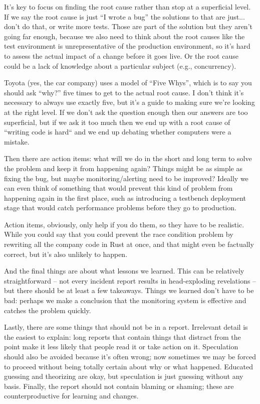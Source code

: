\documentclass[a4paper]{report}
\begin{document}
It's key to focus on finding the root cause rather than stop at a superficial level. If we say the root cause is just ``I wrote a bug'' the solutions to that are just... don't do that, or write more tests. Those are part of the solution but they aren't going far enough, because we also need to think about the root causes like the test environment is unrepresentative of the production environment, so it's hard to assess the actual impact of a change before it goes live. Or the root cause could be a lack of knowledge about a particular subject (e.g., concurrency). 

Toyota (yes, the car company) uses a model of ``Five Whys'', which is to say you should ask ``why?'' five times to get to the actual root cause. I don't think it's necessary to always use exactly five, but it's a guide to making sure we're looking at the right level. If we don't ask the question enough then our answers are too superficial, but if we ask it too much then we end up with a root cause of ``writing code is hard`` and we end up debating whether computers were a mistake.

Then there are action items: what will we do in the short and long term to solve the problem and keep it from happening again? Things might be as simple as fixing the bug, but maybe monitoring/alerting need to be improved? Ideally we can even think of something that would prevent this kind of problem from happening again in the first place, such as introducing a testbench deployment stage that would catch performance problems before they go to production. 

Action items, obviously, only help if you do them, so they have to be realistic. While you could say that you could prevent the race condition problem by rewriting all the company code in Rust at once, and that might even be factually correct, but it's also unlikely to happen.

And the final things are about what lessons we learned. This can be relatively straightforward -- not every incident report results in head-exploding revelations -- but there should be at least a few takeaways. Things we learned don't have to be bad: perhaps we make a conclusion that the monitoring system is effective and catches the problem quickly. 

Lastly, there are some things that should not be in a report. Irrelevant detail is the easiest to explain: long reports that contain things that distract from the point make it less likely that people read it or take action on it. Speculation should also be avoided because it's often wrong; now sometimes we may be forced to proceed without being totally certain about why or what happened. Educated guessing and theorizing are okay, but speculation is just guessing without any basis. Finally, the report should not contain blaming or shaming; these are counterproductive for learning and changes. 
\end{document}
